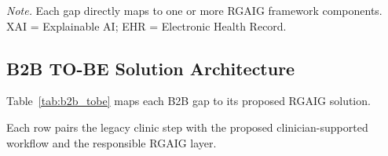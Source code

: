 \vspace{0.5em}
\noindent\textit{Note.} Each gap directly maps to one or more RGAIG framework components. XAI = Explainable AI; EHR = Electronic Health Record.
\fi


\iffalse %
\subsection{B2B TO-BE Solution Architecture}
\label{sec:b2b_tobe}

Table~\ref{tab:b2b_tobe} maps each B2B gap to its proposed RGAIG solution.


\noindent Each row pairs the legacy clinic step with the proposed clinician-supported workflow and the responsible RGAIG layer.

